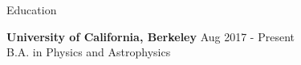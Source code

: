 \documentclass{resume} %
\begin{document}

\begin{rSection}{Education}

{\bf University of California, Berkeley} \hfill {Aug 2017 - Present} 
\\ B.A. in Physics and Astrophysics \hfill {}



\end{rSection}

\end{document}
